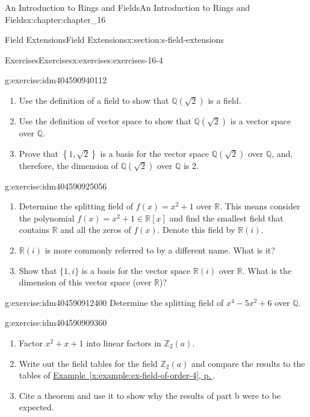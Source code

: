 \documentclass[twoside,10pt,]{book}
\newcommand{\xreffont}{\relax}
\numberwithin{equation}{section}
\begin{document}
\begin{chapterptx}{An Introduction to Rings and Fields}{}{An Introduction to Rings and Fields}{}{}{x:chapter:chapter_16}
\begin{sectionptx}{Field Extensions}{}{Field Extensions}{}{}{x:section:s-field-extensions}
\begin{exercises-subsection}{Exercises}{}{Exercises}{}{}{x:exercises:exercises-16-4}
\begin{divisionexercise}{1}{}{}{g:exercise:idm404590940112}
%
\begin{enumerate}[label=(\alph*)]
\item{}Use the definition of a field to show that \(\mathbb{Q}(\sqrt{2})\) is a field.%
\item{}Use the definition of vector space to show that \(\mathbb{Q}\left(\sqrt{2}\right)\) is a vector space over \(\mathbb{Q}\).%
\item{}Prove that \(\left\{1,\sqrt{2}\right\}\) is a basis for the vector space \(\mathbb{Q}\left(\sqrt{2}\right)\) over \(\mathbb{Q}\), and, therefore, the dimension of  \(\mathbb{Q}(\sqrt{2})\) over \(\mathbb{Q}\) is 2.%
\end{enumerate}
%
\end{divisionexercise}%
\begin{divisionexercise}{2}{}{}{g:exercise:idm404590925056}%
%
\begin{enumerate}[label=(\alph*)]
\item{}Determine the splitting field of \(f(x) = x^2+ 1\) over \(\mathbb{R}\). This means consider the polynomial \(f(x) = x^2+1 \in  \mathbb{R}[x]\) and find the smallest field that contains \(\mathbb{R}\) and all the zeros of \(f(x)\).  Denote this field by \(\mathbb{R}(i)\).%
\item{}\(\mathbb{R}(i)\) is more commonly referred to by a different name. What is it?%
\item{}Show that \(\{1, i\}\) is a basis for the vector space \(\mathbb{R}(i)\) over \(\mathbb{R}\). What is the dimension of this vector space (over \(\mathbb{R}\))?%
\end{enumerate}
%
\end{divisionexercise}%
\begin{divisionexercise}{3}{}{}{g:exercise:idm404590912400}%
Determine the splitting field of \(x^4 - 5x^2 + 6\) over \(\mathbb{Q}\).%
\end{divisionexercise}%
\begin{divisionexercise}{4}{}{}{g:exercise:idm404590909360}%
%
\begin{enumerate}[label=(\alph*)]
\item{}Factor \(x^2 + x + 1\) into linear factors in \(\mathbb{Z}_2(a)\).%
\item{}Write out the field tables for the field \(\mathbb{Z}_2(a)\) and compare the results to the tables of \hyperref[x:example:ex-field-of-order-4]{Example~{\xreffont\ref{x:example:ex-field-of-order-4}}, p.\,\pageref{x:example:ex-field-of-order-4}}.%
\item{}Cite a theorem and use it to show why the results of part b were to be expected.%

\end{enumerate}
\end{divisionexercise}
\end{exercises-subsection}
\end{sectionptx}
\end{chapterptx}
\end{document}
